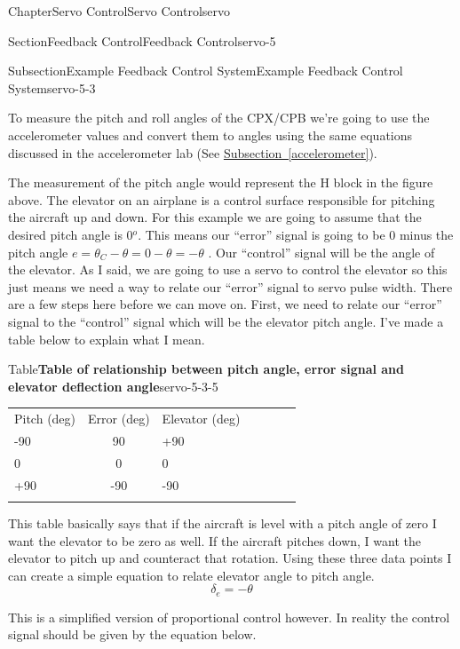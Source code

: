 \documentclass[oneside,10pt,]{book}
\newcommand{\tabularfont}{\relax}
\newcommand{\xreffont}{\relax}
\newcommand{\linkhilite}[1]{\underline{#1}}
\numberwithin{equation}{section}
\newcommand{\hrulethin}  {\noalign{\hrule height 0.04em}}
\begin{document}
\begin{chapterptx}{Chapter}{Servo Control}{}{Servo Control}{}{}{servo}
\begin{sectionptx}{Section}{Feedback Control}{}{Feedback Control}{}{}{servo-5}
\begin{subsectionptx}{Subsection}{Example Feedback Control System}{}{Example Feedback Control System}{}{}{servo-5-3}
\par
To measure the pitch and roll angles of the CPX\slash{}CPB we're going to use the accelerometer values and convert them to angles using the same equations discussed in the accelerometer lab (See \hyperref[accelerometer]{\linkhilite{Subsection~{\xreffont\ref{accelerometer}}}}).%
\par
The measurement of the pitch angle would represent the H block in the figure above. The elevator on an airplane is a control surface responsible for pitching the aircraft up and down. For this example we are going to assume that the desired pitch angle is 0\(^o\). This means our \textquotedblleft{}error\textquotedblright{} signal is going to be 0 minus the pitch angle \(e = \theta_C - \theta = 0 - \theta = -\theta\) . Our \textquotedblleft{}control\textquotedblright{} signal will be the angle of the elevator. As I said, we are going to use a servo to control the elevator so this just means we need a way to relate our \textquotedblleft{}error\textquotedblright{} signal to servo pulse width. There are a few steps here before we can move on. First, we need to relate our \textquotedblleft{}error\textquotedblright{} signal to the \textquotedblleft{}control\textquotedblright{} signal which will be the elevator pitch angle. I've made a table below to explain what I mean.%
\begin{tableptx}{Table}{\textbf{Table of relationship between pitch angle, error signal and elevator deflection angle}}{servo-5-3-5}{}%
\centering%
{\tabularfont%
\begin{tabular}{AcAcAcA}\hrulethin
Pitch (deg)&Error (deg)&Elevator (deg)\tabularnewline\hrulethin
-90&90&+90\tabularnewline\hrulethin
0&0&0\tabularnewline\hrulethin
+90&-90&-90\tabularnewline\hrulethin
\end{tabular}
}%
\end{tableptx}%
This table basically says that if the aircraft is level with a pitch angle of zero I want the elevator to be zero as well. If the aircraft pitches down, I want the elevator to pitch up and counteract that rotation. Using these three data points I can create a simple equation to relate elevator angle to pitch angle.%
\begin{equation}
\delta_e = -\theta\label{e_kpeasy}
\end{equation}
%
\par
This is a simplified version of proportional control however. In reality the control signal should be given by the equation below.%
\begin{equation}

\end{equation}
\end{subsectionptx}
\end{sectionptx}
\end{chapterptx}
\end{document}
